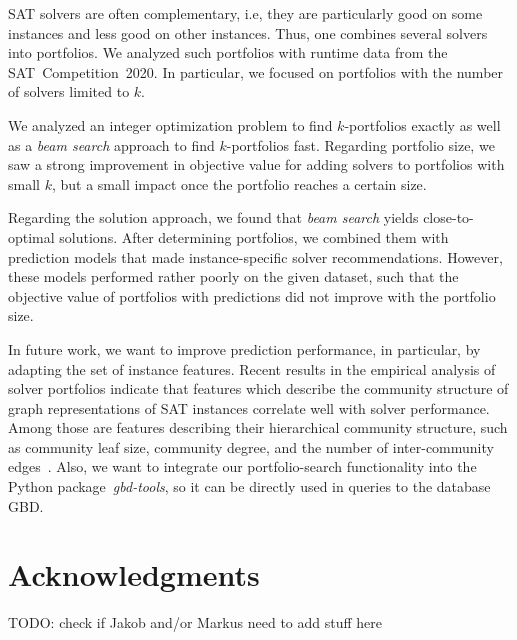 \documentclass[conference]{IEEEtran}
\newcommand{\todo}[1]{{\color{red}TODO: #1}}
\begin{document}
SAT solvers are often complementary, i.e, they are particularly good on some instances and less good on other instances.
Thus, one combines several solvers into portfolios.
We analyzed such portfolios with runtime data from the SAT~Competition~2020.
In particular, we focused on portfolios with the number of solvers limited to $k$.

We analyzed an integer optimization problem to find $k$-portfolios exactly as well as a \emph{beam search} approach to find $k$-portfolios fast.
Regarding portfolio size, we saw a strong improvement in objective value for adding solvers to portfolios with small $k$, but a small impact once the portfolio reaches a certain size.

Regarding the solution approach, we found that \emph{beam search} yields close-to-optimal solutions.
After determining portfolios, we combined them with prediction models that made instance-specific solver recommendations.
However, these models performed rather poorly on the given dataset, such that the objective value of portfolios with predictions did not improve with the portfolio size.

In future work, we want to improve prediction performance, in particular, by adapting the set of instance features.
Recent results in the empirical analysis of solver portfolios indicate that features which describe the community structure of graph representations of SAT instances correlate well with solver performance. 
Among those are features describing their hierarchical community structure, such as community leaf size, community degree, and the number of inter-community edges~\cite{Li:2021:HCS}. 
Also, we want to integrate our portfolio-search functionality into the Python package~\emph{gbd-tools}, so it can be directly used in queries to the database GBD.

\section*{Acknowledgments}

\todo{check if Jakob and/or Markus need to add stuff here}

\balance %



\end{document}
